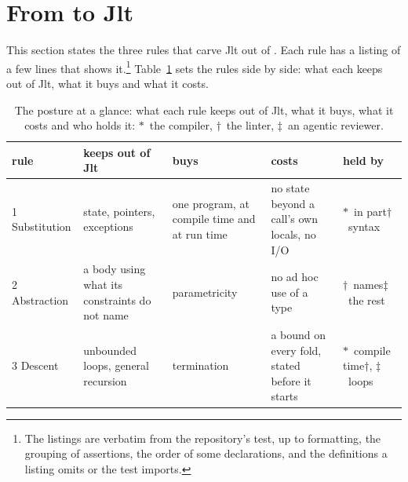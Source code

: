 \section{From \Cpp{} to Jlt}
\label{sec:posture}

This section states the three rules that carve Jlt out of .
Each rule has a listing of a few lines that shows it.\footnote{The listings are verbatim from the repository's test, up to formatting, the grouping of assertions, the order of some declarations, and the definitions a listing omits or the test imports.}
Table~\ref{tab:posture} sets the rules side by side: what each keeps out of Jlt, what it buys and what it costs.

\begin{table}[tb]
\centering
\small
\begin{tabularx}{\linewidth}{@{}l>{\raggedright\arraybackslash}X>{\raggedright\arraybackslash}X>{\raggedright\arraybackslash}X>{\raggedright\arraybackslash}X@{}}
\toprule
rule & keeps out of Jlt & buys & costs & held by \\
\midrule
1 Substitution & state, pointers, exceptions & one program, at compile time and at run time & no state beyond a call's own locals, no I/O & $\ast$~in part\newline $\dagger$~syntax \\
2 Abstraction & a body using what its constraints do not name & parametricity & no ad hoc use of a type & $\dagger$~names\newline $\ddagger$~the rest \\
3 Descent & unbounded loops, general recursion & termination & a bound on every fold, stated before it starts & $\ast$~compile time\newline $\dagger$, $\ddagger$~loops \\
\bottomrule
\end{tabularx}
\caption{The posture at a glance: what each rule keeps out of Jlt, what it buys, what it costs and who holds it: $\ast$~the compiler, $\dagger$~the linter, $\ddagger$~an agentic reviewer.}
\label{tab:posture}
\end{table}

